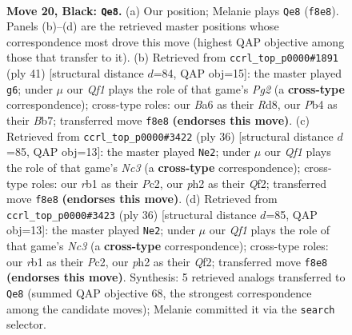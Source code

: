 \documentclass[11pt]{article}
\begin{document}
\clearpage

\begin{figure}[p]\centering
\begin{subfigure}{0.46\textwidth}\centering
\resizebox{\linewidth}{!}{%
\newchessgame
\chessboard[
  setfen={1r3qk1/p1pp1ppp/b7/6n1/1pNP4/1P6/P1P1BP1P/1R2Q1K1 b - - 3 20},
  showmover=false,
  pgfstyle=straightmove, color=movearrow, markmove={f8-e8}
]}
\caption{}
\end{subfigure}\hfill
\begin{subfigure}{0.46\textwidth}\centering
\resizebox{\linewidth}{!}{%
\newchessgame
\chessboard[
  setfen={3r2k1/pb2qppp/1p2p3/1B6/3Nn3/4P2P/PP3PP1/2R1Q1K1 b - - 0 21},
  showmover=false,
  pgfstyle=straightmove, color=movearrow, markmove={g7-g6}
]}
\caption{}
\end{subfigure}
\\[4pt]
\begin{subfigure}{0.46\textwidth}\centering
\resizebox{\linewidth}{!}{%
\newchessgame
\chessboard[
  setfen={2r3k1/2q1bppp/p1p5/1p2p1P1/4Pn1P/2N1BP2/PPP2Q2/1K5R w - - 2 19},
  showmover=false,
  pgfstyle=straightmove, color=movearrow, markmove={c3-e2}
]}
\caption{}
\end{subfigure}\hfill
\begin{subfigure}{0.46\textwidth}\centering
\resizebox{\linewidth}{!}{%
\newchessgame
\chessboard[
  setfen={2r3k1/2q1bppp/p1p5/1p2p1P1/4Pn1P/2N1BP2/PPP2Q2/1K5R w - - 2 19},
  showmover=false,
  pgfstyle=straightmove, color=movearrow, markmove={c3-e2}
]}
\caption{}
\end{subfigure}
\caption{\textbf{Move 20, Black: \texttt{Qe8}.} (a) Our position; Melanie plays \texttt{Qe8} (\texttt{f8e8}). Panels (b)--(d) are the retrieved master positions whose correspondence most drove this move (highest QAP objective among those that transfer to it). (b) Retrieved from \texttt{ccrl\_top\_p0000\#1891} (ply 41) [structural distance $d$=84, QAP obj=15]: the master played \texttt{g6}; under $\mu$ our \emph{Qf1} plays the role of that game's \emph{Pg2} (a \textbf{cross-type} correspondence); cross-type roles: our \emph{B}a6 as their \emph{R}d8, our \emph{P}b4 as their \emph{B}b7; transferred move \texttt{f8e8} \textbf{(endorses this move)}. (c) Retrieved from \texttt{ccrl\_top\_p0000\#3422} (ply 36) [structural distance $d$=85, QAP obj=13]: the master played \texttt{Ne2}; under $\mu$ our \emph{Qf1} plays the role of that game's \emph{Nc3} (a \textbf{cross-type} correspondence); cross-type roles: our \emph{r}b1 as their \emph{P}c2, our \emph{p}h2 as their \emph{Q}f2; transferred move \texttt{f8e8} \textbf{(endorses this move)}. (d) Retrieved from \texttt{ccrl\_top\_p0000\#3423} (ply 36) [structural distance $d$=85, QAP obj=13]: the master played \texttt{Ne2}; under $\mu$ our \emph{Qf1} plays the role of that game's \emph{Nc3} (a \textbf{cross-type} correspondence); cross-type roles: our \emph{r}b1 as their \emph{P}c2, our \emph{p}h2 as their \emph{Q}f2; transferred move \texttt{f8e8} \textbf{(endorses this move)}. Synthesis: 5 retrieved analogs transferred to \texttt{Qe8} (summed QAP objective 68, the strongest correspondence among the candidate moves); Melanie committed it via the \texttt{search} selector.}
\label{fig:thought-m39}
\end{figure}
\end{document}
